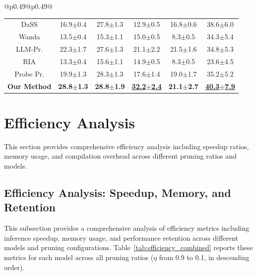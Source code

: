 \begin{table}[!t]
\begin{tabular}{@{}p{}@{}p{}@{}}
{\begin{tabular}{c c c c c c}
DaSS & 16.9{\scriptsize$\pm$0.4} & 27.8{\scriptsize$\pm$1.3} & 12.9{\scriptsize$\pm$0.5} & 16.8{\scriptsize$\pm$0.6} & 38.6{\scriptsize$\pm$6.0} \\
Wanda & 13.5{\scriptsize$\pm$0.4} & 15.3{\scriptsize$\pm$1.1} & 15.0{\scriptsize$\pm$0.5} & 8.3{\scriptsize$\pm$0.5} & 34.3{\scriptsize$\pm$5.4} \\
LLM-Pr. & 22.3{\scriptsize$\pm$1.7} & 27.6{\scriptsize$\pm$1.3} & 21.1{\scriptsize$\pm$2.2} & 21.5{\scriptsize$\pm$1.6} & 34.8{\scriptsize$\pm$5.3} \\
RIA & 13.3{\scriptsize$\pm$0.4} & 15.6{\scriptsize$\pm$1.1} & 14.9{\scriptsize$\pm$0.5} & 8.3{\scriptsize$\pm$0.5} & 23.6{\scriptsize$\pm$4.5} \\
Probe Pr. & 19.9{\scriptsize$\pm$1.3} & 28.3{\scriptsize$\pm$1.3} & 17.6{\scriptsize$\pm$1.4} & 19.0{\scriptsize$\pm$1.7} & 35.2{\scriptsize$\pm$5.2} \\
\rowcolor{icmlblue} \textbf{Our Method} & \textbf{28.8{\scriptsize$\pm$1.3}} & \textbf{28.8{\scriptsize$\pm$1.9}} & \textbf{\underline{32.2{\scriptsize$\pm$2.4}}} & \textbf{21.1{\scriptsize$\pm$2.7}} & \textbf{\underline{40.3{\scriptsize$\pm$7.9}}} \\
\bottomrule
\end{tabular}
}
\end{tabular}
\label{tab:task_type_breakdown}
\end{table}


\section{Efficiency Analysis}
\label{app:efficiency}

This section provides comprehensive efficiency analysis including speedup ratios, memory usage, and compilation overhead across different pruning ratios and models.

\subsection{Efficiency Analysis: Speedup, Memory, and Retention}
\label{app:efficiency_combined}

This subsection provides a comprehensive analysis of efficiency metrics including inference speedup, memory usage, and performance retention across different models and pruning configurations.
Table~\ref{tab:efficiency_combined} reports these metrics for each model across all pruning ratios ($\eta$ from 0.9 to 0.1, in descending order).

